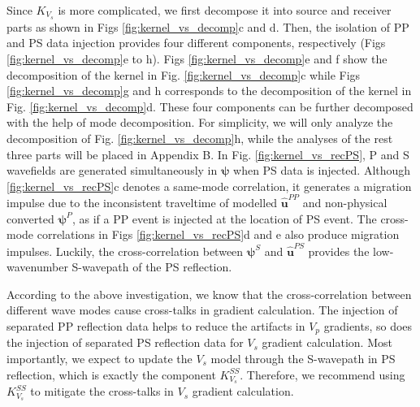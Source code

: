 \documentclass[extra,mreferee]{gji}
\newcommand{\bsy}[1]{\boldsymbol{{}#1}}
\begin{document}
Since $K_{V_s}$ is more complicated, we first decompose it into  source and receiver
parts as shown in Figs \ref{fig:kernel_vs_decomp}c and d. Then, the isolation of PP
and PS data injection provides four different components, respectively
(Figs \ref{fig:kernel_vs_decomp}e to h).
Figs \ref{fig:kernel_vs_decomp}e and f show the decomposition of
the kernel in Fig. \ref{fig:kernel_vs_decomp}c
while Figs \ref{fig:kernel_vs_decomp}g and h corresponds to the decomposition of the kernel in Fig.
\ref{fig:kernel_vs_decomp}d.
These four components can be further decomposed with the help of mode decomposition. 
For simplicity, we will only analyze the decomposition of  Fig. \ref{fig:kernel_vs_decomp}h,
while the analyses of the rest three parts will be placed in Appendix B.
In Fig. \ref{fig:kernel_vs_recPS}, 
P and S wavefields are
generated simultaneously in $\bsy{\psi}$ when PS data is injected. 
Although \ref{fig:kernel_vs_recPS}c denotes a same-mode correlation, 
it generates a migration impulse 
due to the  inconsistent traveltime of modelled $\mathbf{\hat{u}}^{PP}$ and non-physical
converted $\bsy{\psi}^{P}$, as if a PP event is injected at the location of PS event.
The cross-mode correlations in 
Figs \ref{fig:kernel_vs_recPS}d and e
also produce migration impulses. 
Luckily, the cross-correlation between $\bsy{\psi}^{S}$ and $\mathbf{\hat{u}}^{PS}$ provides the
low-wavenumber S-wavepath of the PS reflection.

According to the above investigation, we know that the cross-correlation between
different wave modes cause cross-talks in gradient calculation. The injection of separated PP
reflection data helps to reduce the artifacts in $V_p$
gradients, so does the injection of separated PS reflection data for $V_s$ gradient calculation.
Most importantly, we expect to update the $V_s$ model through the S-wavepath in PS reflection, which is
exactly the component $K^{SS}_{V_s}$.  
Therefore, we recommend using $K^{SS}_{V_s}$ to mitigate the cross-talks in $V_s$ gradient calculation.
\end{document}

